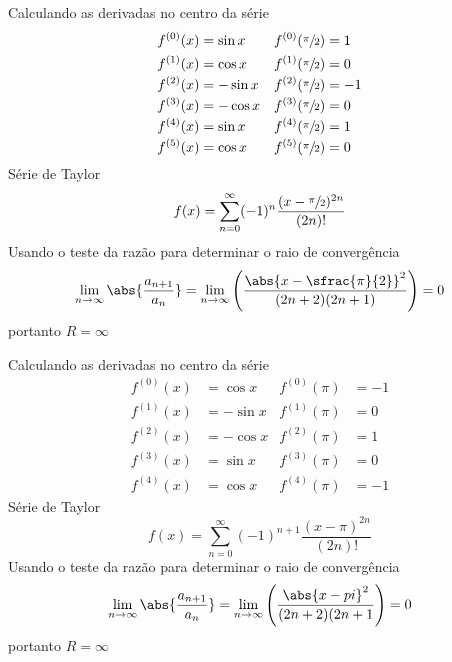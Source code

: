 \begin{exercises}
\begin{exercise}
\begin{answer}
\begin{alphalist}
  \item Calculando as derivadas no centro da série
  \begin{align*}
  	f^{(0)}(x) & =  \sin x & f^{(0)}(\sfrac{\pi}{2}) & =  1 \\
  	f^{(1)}(x) & =  \cos x & f^{(1)}(\sfrac{\pi}{2}) & =  0 \\
  	f^{(2)}(x) & = -\sin x & f^{(2)}(\sfrac{\pi}{2}) & = -1 \\
  	f^{(3)}(x) & = -\cos x & f^{(3)}(\sfrac{\pi}{2}) & =  0 \\
  	f^{(4)}(x) & =  \sin x & f^{(4)}(\sfrac{\pi}{2}) & =  1 \\
  	f^{(5)}(x) & =  \cos x & f^{(5)}(\sfrac{\pi}{2}) & =  0
  \end{align*}
  Série de Taylor
  \[
    f(x) = \sum_{n=0}^\infty (-1)^n \frac{(x-\sfrac{\pi}{2})^{2n}}{(2n)!}
  \]
  Usando o teste da razão para determinar o raio de convergência
  \[
    \lim_{n\to\infty}\abs{\frac{a_{n+1}}{a_n}}
    = \lim_{n\to\infty}\left( \frac{\abs{x-\sfrac{\pi}{2}}^2}{(2n+2)(2n+1)} \right) = 0
  \]
  portanto $R=\infty$

  \item Calculando as derivadas no centro da série
  \begin{align*}
  	f^{(0)}(x) & =  \cos x & f^{(0)}(\pi) & = -1 \\
  	f^{(1)}(x) & = -\sin x & f^{(1)}(\pi) & =  0 \\
  	f^{(2)}(x) & = -\cos x & f^{(2)}(\pi) & =  1 \\
  	f^{(3)}(x) & =  \sin x & f^{(3)}(\pi) & =  0 \\
  	f^{(4)}(x) & =  \cos x & f^{(4)}(\pi) & = -1
  \end{align*}
  Série de Taylor
  \[
    f(x) = \sum_{n=0}^\infty (-1)^{n+1} \frac{(x-\pi)^{2n}}{(2n)!}
  \]
  Usando o teste da razão para determinar o raio de convergência
  \[
    \lim_{n\to\infty}\abs{\frac{a_{n+1}}{a_n}}
    = \lim_{n\to\infty}\left( \frac{\abs{x-pi}^2}{(2n+2)(2n+1} \right) = 0
  \]
  portanto $R=\infty$


\end{alphalist}
\end{answer}
\end{exercise}
\end{exercises}
